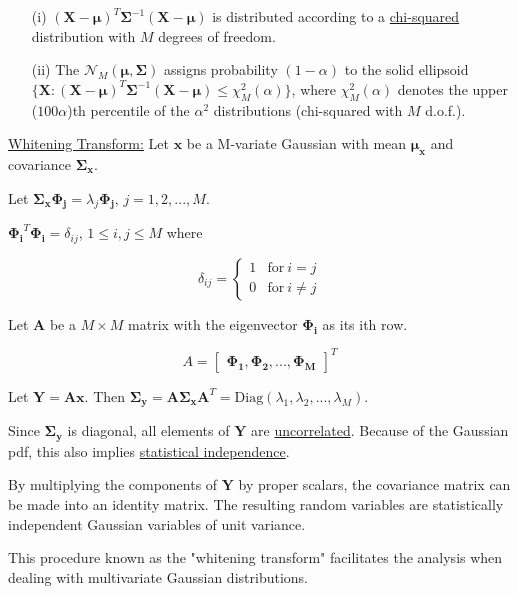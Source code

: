 \documentclass[fleqn]{article}
\begin{document}
	\begin{enumerate}
		\item[(i)] $(\mathbf{X} - \boldsymbol{\mu})^T\mathbf{\Sigma}^{-1}(\mathbf{X} - \boldsymbol{\mu})$ is distributed according to a \underline{chi-squared} distribution with $M$ degrees of freedom.
		
		\item[(ii)] The $\mathcal{N}_M(\boldsymbol{\mu}, \mathbf{\Sigma})$ assigns probability $(1 - \alpha)$ to the solid ellipsoid \newline $\{\mathbf{X}: (\mathbf{X} - \boldsymbol{\mu})^T\mathbf{\Sigma}^{-1}(\mathbf{X} - \boldsymbol{\mu}) \leq \chi_M^2(\alpha)\}$, where $\chi_M^2(\alpha)$ denotes the upper ($100\alpha$)th percentile of the $\alpha^2$ distributions (chi-squared with $M$ d.o.f.).
		
	\end{enumerate}
	
	\underline{Whitening Transform:} Let $\mathbf{x}$ be a M-variate Gaussian with mean $\mathbf{\boldsymbol{\mu}_x}$ and covariance $\mathbf{\Sigma_x}$.
		
	Let $\mathbf{\Sigma_x}\mathbf{\Phi_j} = \lambda_j\mathbf{\Phi_j}$, $j = 1,2,...,M$.
	
	$\mathbf{\Phi_i}^T\mathbf{\Phi_i} = \delta_{ij}$, $1 \leq i,j \leq M$ where
	
	\begin{equation*}
		\delta_{ij} = \begin{cases}
			1 & \text{for}\ i = j \\
			0 & \text{for}\ i \neq j
		\end{cases}
	\end{equation*}
	
	Let $\mathbf{A}$ be a $M \times M$ matrix with the eigenvector $\mathbf{\Phi_i}$ as its ith row.
	
	\begin{equation*}
		A = \begin{bmatrix}\mathbf{\Phi_1}, \mathbf{\Phi_2},...,\mathbf{\Phi_M}\end{bmatrix}^T
	\end{equation*}
	
	Let $\mathbf{Y} = \mathbf{Ax}$. Then $\mathbf{\Sigma_y} = \mathbf{A\Sigma_x}\mathbf{A}^T = \text{Diag}(\lambda_1,\lambda_2,...,\lambda_M)$.
	
	Since $\mathbf{\Sigma_y}$ is diagonal, all elements of $\mathbf{Y}$ are \underline{uncorrelated}. Because of the Gaussian pdf, this also implies \underline{statistical independence}.
	
	By multiplying the components of $\mathbf{Y}$ by proper scalars, the covariance matrix can be made into an identity matrix. The resulting random variables are statistically independent Gaussian variables of unit variance.
	
	This procedure known as the "whitening transform" facilitates the analysis when dealing with multivariate Gaussian distributions.
\end{document}
